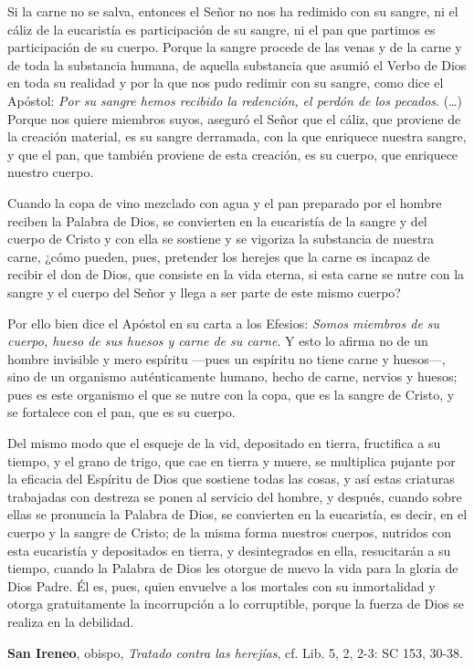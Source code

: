 \begin{patercite}
Si la carne no se salva, entonces el Señor no nos ha redimido con su sangre, ni el cáliz de la eucaristía es participación de su sangre, ni el pan que partimos es participación de su cuerpo. Porque la sangre procede de las venas y de la carne y de toda la substancia humana, de aquella substancia que asumió el Verbo de Dios en toda su realidad y por la que nos pudo redimir con su sangre, como dice el Apóstol: \textit{Por su sangre hemos recibido la redención, el perdón de los pecados}. (\ldots) Porque nos quiere miembros suyos, aseguró el Señor que el cáliz, que proviene de la creación material, es su sangre derramada, con la que enriquece nuestra sangre, y que el pan, que también proviene de esta creación, es su cuerpo, que enriquece nuestro cuerpo.
	
Cuando la copa de vino mezclado con agua y el pan preparado por el hombre reciben la Palabra de Dios, se convierten en la eucaristía de la sangre y del cuerpo de Cristo y con ella se sostiene y se vigoriza la substancia de nuestra carne, ¿cómo pueden, pues, pretender los herejes que la carne es incapaz de recibir el don de Dios, que consiste en la vida eterna, si esta carne se nutre con la sangre y el cuerpo del Señor y llega a ser parte de este mismo cuerpo?
	
Por ello bien dice el Apóstol en su carta a los Efesios: \textit{Somos miembros de su cuerpo, hueso de sus huesos y carne de su carne}. Y esto	lo afirma no de un hombre invisible y mero espíritu ---pues un espíritu	no tiene carne y huesos---, sino de un organismo auténticamente humano,	hecho de carne, nervios y huesos; pues es este organismo el que se nutre 	con la copa, que es la sangre de Cristo, y se fortalece con el pan, que 	es su cuerpo.
	
Del mismo modo que el esqueje de la vid, depositado en tierra, fructifica a su tiempo, y el grano de trigo, que cae en tierra y muere, se multiplica pujante por la eficacia del Espíritu de Dios que sostiene todas las cosas, y así estas criaturas trabajadas con destreza se ponen al servicio del hombre, y después, cuando sobre ellas se pronuncia la Palabra de Dios, se convierten en la eucaristía, es decir, en el cuerpo y la sangre de Cristo; de la misma forma nuestros cuerpos, nutridos con esta eucaristía y depositados en tierra, y desintegrados en ella, resucitarán a su tiempo, cuando la Palabra de Dios les otorgue de nuevo la vida para la gloria de Dios Padre. Él es, pues, quien envuelve a los mortales con su inmortalidad y otorga gratuitamente la incorrupción a lo corruptible, porque la fuerza de Dios se realiza en la debilidad.
	
	\textbf{San Ireneo}, obispo, \textit{Tratado contra las herejías}, cf. Lib. 5, 2, 2-3: SC 153, 30-38.
\end{patercite}

